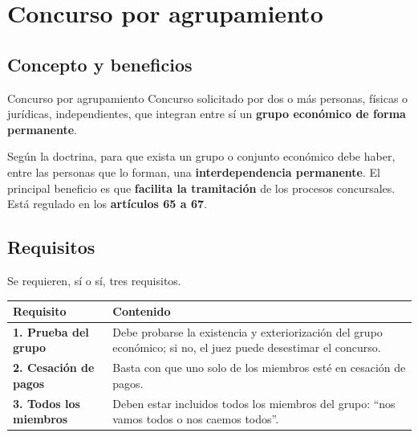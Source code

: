 \documentclass[12pt,oneside]{book}
\renewcommand{\arraystretch}{1.25}
\begin{document}
\renewcommand{\arraystretch}{1.25}

\chapter[Concurso por agrupamiento]{Concurso por agrupamiento}

\section{Concepto y beneficios}

\begin{definition}{Concurso por agrupamiento}
Concurso solicitado por dos o más personas, físicas o jurídicas, independientes, que integran entre sí un \textbf{grupo económico de forma permanente}.
\end{definition}

Según la doctrina, para que exista un grupo o conjunto económico debe haber, entre las personas que lo forman, una \textbf{interdependencia permanente}. El principal beneficio es que \textbf{facilita la tramitación} de los procesos concursales. Está regulado en los \textbf{artículos 65 a 67}.

\section{Requisitos}

Se requieren, sí o sí, tres requisitos.

\begin{table}[H]
\centering
\small
\begin{tabularx}{\textwidth}{@{}>{\raggedright\arraybackslash}p{3.8cm}Y@{}}
\toprule
\textbf{Requisito} & \textbf{Contenido} \\
\midrule
\textbf{1. Prueba del grupo} & Debe probarse la existencia y exteriorización del grupo económico; si no, el juez puede desestimar el concurso. \\
\textbf{2. Cesación de pagos} & Basta con que uno solo de los miembros esté en cesación de pagos. \\
\textbf{3. Todos los miembros} & Deben estar incluidos todos los miembros del grupo: ``nos vamos todos o nos caemos todos''. \\
\bottomrule
\end{tabularx}
\end{table}
\end{document}
